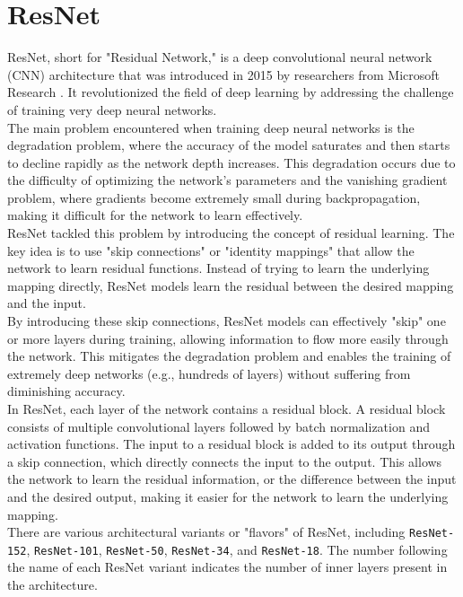 \newpage

\section{ResNet}

ResNet, short for "Residual Network," is a deep convolutional neural network (CNN) architecture that was introduced in 2015 by researchers from Microsoft Research \cite{ResNetPaper}. It revolutionized the field of deep learning by addressing the challenge of training very deep neural networks. \\

The main problem encountered when training deep neural networks is the degradation problem, where the accuracy of the model saturates and then starts to decline rapidly as the network depth increases. This degradation occurs due to the difficulty of optimizing the network's parameters and the vanishing gradient problem, where gradients become extremely small during backpropagation, making it difficult for the network to learn effectively. \\

ResNet tackled this problem by introducing the concept of residual learning. The key idea is to use "skip connections" or "identity mappings" that allow the network to learn residual functions. Instead of trying to learn the underlying mapping directly, ResNet models learn the residual between the desired mapping and the input. \\

By introducing these skip connections, ResNet models can effectively "skip" one or more layers during training, allowing information to flow more easily through the network. This mitigates the degradation problem and enables the training of extremely deep networks (e.g., hundreds of layers) without suffering from diminishing accuracy. \\

In ResNet, each layer of the network contains a residual block. A residual block consists of multiple convolutional layers followed by batch normalization and activation functions. The input to a residual block is added to its output through a skip connection, which directly connects the input to the output. This allows the network to learn the residual information, or the difference between the input and the desired output, making it easier for the network to learn the underlying mapping.  \\

There are various architectural variants or "flavors" of ResNet, including {\tt ResNet-152}, {\tt ResNet-101}, {\tt ResNet-50}, {\tt ResNet-34}, and {\tt ResNet-18}. The number following the name of each ResNet variant indicates the number of inner layers present in the architecture.

